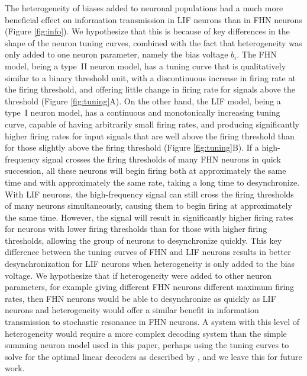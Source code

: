 \documentclass[12pt]{article}
\newcommand{\fig}[1]{Figure \ref{fig:#1}}
\begin{document}
The heterogeneity of biases added to neuronal populations had a much more beneficial effect on information transmission in LIF neurons than in FHN neurons (\fig{info}). We hypothesize that this is because of key differences in the shape of the neuron tuning curves, combined with the fact that heterogeneity was only added to one neuron parameter, namely the bias voltage $b_i$. The FHN model, being a type~II neuron model, has a tuning curve that is qualitatively similar to a binary threshold unit, with a discontinuous increase in firing rate at the firing threshold, and offering little change in firing rate for signals above the threshold (\fig{tuning}A). On the other hand, the LIF model, being a type~I neuron model, has a continuous and monotonically increasing tuning curve, capable of having arbitrarily small firing rates, and producing significantly higher firing rates for input signals that are well above the firing threshold than for those slightly above the firing threshold (\fig{tuning}B). If a high-frequency signal crosses the firing thresholds of many FHN neurons in quick succession, all these neurons will begin firing both at approximately the same time and with approximately the same rate, taking a long time to desynchronize. With LIF neurons, the high-frequency signal can still cross the firing thresholds of many neurons simultaneously, causing them to begin firing at approximately the same time. However, the signal will result in significantly higher firing rates for neurons with lower firing thresholds than for those with higher firing thresholds, allowing the group of neurons to desynchronize quickly. This key difference between the tuning curves of FHN and LIF neurons results in better desynchronization for LIF neurons when heterogeneity is only added to the bias voltage. We hypothesize that if heterogeneity were added to other neuron parameters, for example giving different FHN neurons different maximum firing rates, then FHN neurons would be able to desynchronize as quickly as LIF neurons and heterogeneity would offer a similar benefit in information transmission to stochastic resonance in FHN neurons. A system with this level of heterogeneity would require a more complex decoding system than the simple summing neuron model used in this paper, perhaps using the tuning curves to solve for the optimal linear decoders as described by \cite{Eliasmith2003}, and we leave this for future work.
\end{document}
